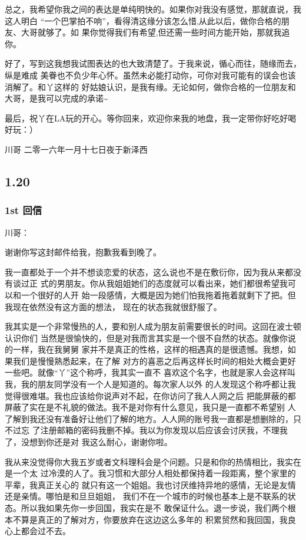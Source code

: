 \documentclass[11pt]{article}
\begin{document}
总之，我希望你我之间的表达是单纯明快的。如果你对我没有感觉，那就直说，我这人明白
“一个巴掌拍不响”，看得清这缘分该怎么惜,从此以后，做你合格的朋友、大哥就够了。如
果你觉得我们有希望,但还需一些时间方能开始，那就我追你。

好了，写到这我想我试图表达的也大致清楚了。于我来说，循心而往，随缘而去，纵是难成
美眷也不负少年心怀。虽然未必能打动你，可你对我可能有的误会也该消解了。和丫这样的
好姑娘认识，是我有缘。无论如何，做你合格的一位朋友和大哥，是我可以完成的承诺\textasciitilde{}

最后，祝丫在LA玩的开心。等你回来，欢迎你来我的地盘，我一定带你好吃好喝好玩：）

            川哥
二零一六年一月十七日夜于新泽西

\subsection*{1.20}
\label{sec:orgheadline38}

\subsubsection*{1st 回信}
\label{sec:orgheadline33}
川哥：

谢谢你写这封邮件给我，抱歉我看到晚了。

我一直都处于一个并不想谈恋爱的状态，这么说也不是在敷衍你，因为我从来都没有谈过正
式的男朋友。你从我姐姐她们的态度就可以看出来，她们都很希望我可以和一个很好的人开
始一段感情，大概是因为她们怕我拖着拖着就剩下了把。但我现在依然没有这方面的想法，
现在的状态我就很舒服了。

我其实是一个非常慢热的人，要和别人成为朋友前需要很长的时间。这回在波士顿认识你们
当然是很愉快的，但是对我而言其实是一个很不自然的状态。就像你说的一样，我在我舅舅
家并不是真正的性格，这样的相遇真的是很遗憾。我想，如果我们是慢慢熟悉起来，在了解
对方的喜恶之后再这样长时间的相处大概会更好一些吧。就像“丫”这个称呼，我其实一直不
喜欢这个名字，也就是家人会这样叫我，我的朋友同学没有一个人是知道的。每次家人以外
的人发现这个称呼都让我觉得很难堪。我也应该给你说声对不起，在你访问了我人人网之后
把能屏蔽的都屏蔽了实在是不礼貌的做法。我不是对你有什么意见，我只是一直都不希望别
人了解到我还没有准备好让他们了解的地方。人人网的账号我一直都是想删除的，只不过忘
了注册邮箱的密码我删不掉。我以为你发现以后应该会讨厌我，不理我了，没想到你还是对
我这么耐心，谢谢你啦。

我从来没觉得你大我五岁或者文科理科会是个问题。只是和你的热情相比，我实在是一个太
过冷漠的人了。我习惯和大部分人相处都保持着一段距离，整个家里的平辈，我真正关心的
就只有这一个姐姐。我也讨厌维持异地的感情，无论是友情还是亲情。哪怕是和旦旦姐姐，
我们不在一个城市的时候也基本上是不联系的状态。所以我如果先你一步回国，我实在是不
敢保证什么。退一步说，我们两个根本不算是真正的了解对方，你要放弃在这边这么多年的
积累贸然和我回国，我良心上都会过不去。
\end{document}
